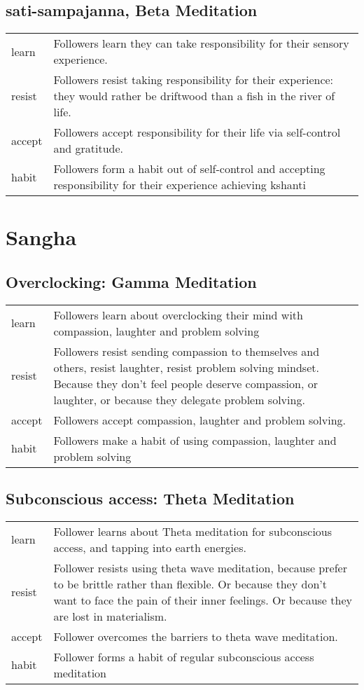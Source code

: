 \chapter{sati-sampajanna, Beta Meditation}
\begin{tabular}{lp{}}
learn & Followers learn they can take responsibility for their sensory
experience.\\
resist & Followers resist taking responsibility for their experience:
they would rather be driftwood than a fish in the river of life.\\
accept & Followers accept responsibility for their life via 
self-control and gratitude.\\
habit & Followers form a habit out of self-control and accepting
responsibility for their experience achieving kshanti\\
\end{tabular}


\part{Sangha}
\chapter{Overclocking: Gamma Meditation}
\begin{tabular}{lp{}}
learn & Followers learn about overclocking their mind with compassion,
laughter and problem solving\\
resist & Followers resist sending compassion to themselves and others,
resist laughter, resist problem solving mindset. Because they don't feel people
deserve compassion, or laughter, or because they delegate problem solving.\\
accept & Followers accept compassion, laughter and problem solving.\\
habit & Followers make a habit of using compassion, laughter and problem
solving\\
\end{tabular}


\chapter{Subconscious access: Theta Meditation}

\begin{tabular}{lp{}}
learn & Follower learns about Theta meditation 
for subconscious access, and tapping into earth energies.\\
resist & Follower resists using theta wave meditation, 
because prefer to be brittle rather than flexible. 
Or because they don't want to face the pain of their inner feelings.
Or because they are lost in materialism.\\
accept & Follower overcomes the barriers to theta wave meditation.\\
habit & Follower forms a habit of regular subconscious access
meditation\\
\end{tabular}


